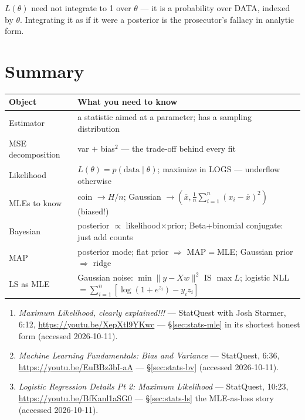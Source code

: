 \begin{tripwire}
$L(\theta)$ need not integrate to 1 over $\theta$ --- it is a
probability over DATA, indexed by $\theta$. Integrating it as if it were
a posterior is the prosecutor's fallacy in analytic form.
\end{tripwire}

\section{Summary}

\begin{center}
\begin{tabularx}{\textwidth}{l>{\raggedright\arraybackslash}X}
\toprule
\textbf{Object} & \textbf{What you need to know}\\
\midrule
Estimator & a statistic aimed at a parameter; has a sampling
distribution \\
MSE decomposition & var $+$ bias$^{2}$ --- the trade-off behind every
fit \\
Likelihood & $L(\theta)=p(\text{data}\mid\theta)$; maximize in LOGS ---
underflow otherwise \\
MLEs to know & coin $\to H/n$; Gaussian $\to(\bar x,\frac1n\sum_{i=1}^{n}
(x_i-\bar x)^2)$ (biased!) \\
Bayesian & posterior $\propto$ likelihood$\times$prior; Beta+binomial
conjugate: just add counts \\
MAP & posterior mode; flat prior $\Rightarrow$ MAP$=$MLE; Gaussian
prior $\Rightarrow$ ridge \\
LS as MLE & Gaussian noise: $\min\|y-Xw\|^2$ IS $\max L$; logistic NLL
$=\sum_{i=1}^{n}[\log(1+e^{z_i})-y_iz_i]$ \\
\bottomrule
\end{tabularx}
\end{center}
\begin{rulebox}
\begin{enumerate}
\item \emph{Maximum Likelihood, clearly explained!!!} --- StatQuest
with Josh Starmer, 6:12, \url{https://youtu.be/XepXtl9YKwc} ---
\S\ref{sec:stats-mle} in its shortest honest form
(accessed 2026-10-11).
\item \emph{Machine Learning Fundamentals: Bias and Variance} ---
StatQuest, 6:36, \url{https://youtu.be/EuBBz3bI-aA} ---
\S\ref{sec:stats-bv} (accessed 2026-10-11).
\item \emph{Logistic Regression Details Pt 2: Maximum Likelihood} ---
StatQuest, 10:23, \url{https://youtu.be/BfKanl1aSG0} ---
\S\ref{sec:stats-ls} the MLE-as-loss story (accessed 2026-10-11).
\end{enumerate}
\end{rulebox}

